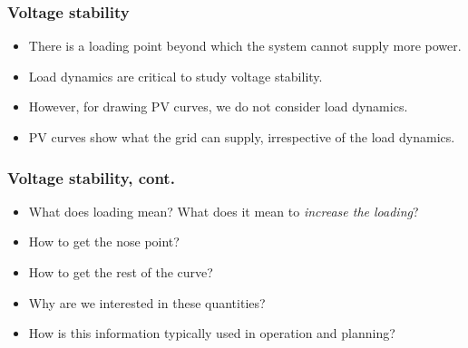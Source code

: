 \documentclass{beamer}
\newlength\fheight
\newlength\fwidth
\begin{document}
\begin{frame}
  \frametitle{Voltage stability}
  \begin{itemize}
  \item There is a loading point beyond which the system cannot supply more power.
  \item Load dynamics are critical to study voltage stability.
  \item However, for drawing PV curves, we do not consider load dynamics.
  \item PV curves show what the grid can supply, irrespective of the load dynamics.
  \end{itemize}
\setlength\fheight{0.3\textheight} 
\setlength{}

\end{frame}

\begin{frame}
  \frametitle{Voltage stability, cont.}
  \begin{itemize}
  \item What does loading mean? What does it mean to \emph{increase the loading}?
  \item How to get the nose point?
  \item How to get the rest of the curve?
  \item Why are we interested in these quantities?
  \item How is this information typically used in operation and planning?
  \end{itemize}
\setlength\fheight{0.3\textheight} 
\setlength{}

\end{frame}
\end{document}
